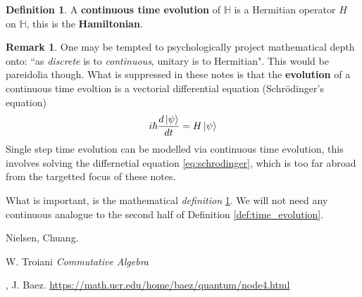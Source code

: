 \documentclass[12pt]{article}
\theoremstyle{plain}
\theoremstyle{definition}
\newtheorem{defn}[thm]{Definition} %
\newtheorem{remark}[thm]{Remark}
\newcommand{\bb}[1]{\mathbb{#1}}
\begin{document}
\begin{defn}\label{def:cont_time_evolution}
	A \textbf{continuous time evolution} of $\bb{H}$ is a Hermitian operator $H$ on $\bb{H}$, this is the \textbf{Hamiltonian}.
\end{defn}

\begin{remark}
	One may be tempted to psychologically project mathematical depth onto: ``as \emph{discrete} is to \emph{continuous}, unitary is to Hermitian". This would be pareidolia though. What is suppressed in these notes is that the \textbf{evolution} of a continuous time evoltion is a vectorial differential equation (Schr\"{o}dinger's equation)
	\begin{equation}\label{eq:schrodinger}
		i\hbar \frac{d\ket{\psi}}{dt} = H\ket{\psi}
	\end{equation}
	Single step time evolution can be modelled via continuous time evolution, this involves solving the differnetial equation \eqref{eq:schrodinger}, which is too far abroad from the targetted focus of these notes.
	
	What is important, is the mathematical \emph{definition} \ref{def:cont_time_evolution}. We will not need any continuous analogue to the second half of Definition \ref{def:time_evolution}.
\end{remark}
	
	\begin{thebibliography}{9}
		 Nielsen, Chuang.
		
		 W. Troiani \emph{Commutative Algebra}
		
		, J. Baez. \url{https://math.ucr.edu/home/baez/quantum/node4.html}
	\end{thebibliography}
\end{document}

